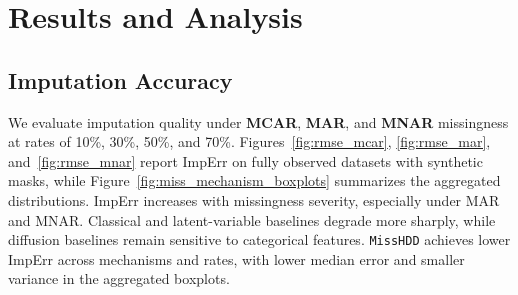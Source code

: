 \documentclass[times, review, 10pt]{elsarticle}
\begin{document}







\section{Results and Analysis}



\subsection{Imputation Accuracy}
We evaluate imputation quality under \textbf{MCAR}, \textbf{MAR}, and
\textbf{MNAR} missingness at rates of 10\%, 30\%, 50\%, and 70\%.
Figures~\ref{fig:rmse_mcar}, \ref{fig:rmse_mar}, and~\ref{fig:rmse_mnar}
report ImpErr on fully observed datasets with synthetic masks, while
Figure~\ref{fig:miss_mechanism_boxplots} summarizes the aggregated
distributions. ImpErr increases with missingness severity, especially under MAR and MNAR.
Classical and latent-variable baselines degrade more sharply, while diffusion
baselines remain sensitive to categorical features. \texttt{MissHDD} achieves
lower ImpErr across mechanisms and rates, with lower median error and smaller
variance in the aggregated boxplots.
\end{document}
